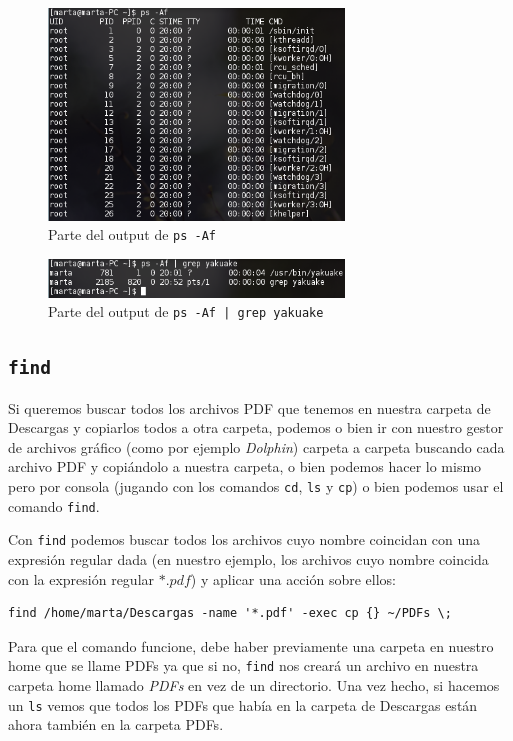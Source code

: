 \documentclass[10pt,a4paper,spanish]{article}
\numberwithin{equation}{section} %
\numberwithin{figure}{section} %
\numberwithin{table}{section} %
\begin{document}
\begin{figure}[!h]
    \centering
    \includegraphics[width=0.7\textwidth]{42}
    \caption{Parte del output de \texttt{ps -Af}}
    \label{psaf}
\end{figure}

\begin{figure}[!h]
    \centering
    \includegraphics[width=0.7\textwidth]{43}
    \caption{Parte del output de \texttt{ps -Af | grep yakuake}}
    \label{psafyaku}
\end{figure}

\subsection{\texttt{find}}
Si queremos buscar todos los archivos PDF que tenemos en nuestra carpeta de Descargas y copiarlos todos a otra carpeta, podemos o bien ir con nuestro gestor de archivos gráfico (como por ejemplo \textit{Dolphin}) carpeta a carpeta buscando cada archivo PDF y copiándolo a nuestra carpeta, o bien podemos hacer lo mismo pero por consola (jugando con los comandos \texttt{cd}, \texttt{ls} y \texttt{cp}) o bien podemos usar el comando \texttt{find}.

Con \texttt{find} podemos buscar todos los archivos cuyo nombre coincidan con una expresión regular dada (en nuestro ejemplo, los archivos cuyo nombre coincida con la expresión regular $*.pdf$) y aplicar una acción sobre ellos:

\begin{verbatim}
find /home/marta/Descargas -name '*.pdf' -exec cp {} ~/PDFs \;
\end{verbatim}

Para que el comando funcione, debe haber previamente una carpeta en nuestro home que se llame PDFs ya que si no, \texttt{find} nos creará un archivo en nuestra carpeta home llamado \textit{PDFs} en vez de un directorio. Una vez hecho, si hacemos un \texttt{ls} vemos que todos los PDFs que había en la carpeta de Descargas están ahora también en la carpeta PDFs.
\end{document}

